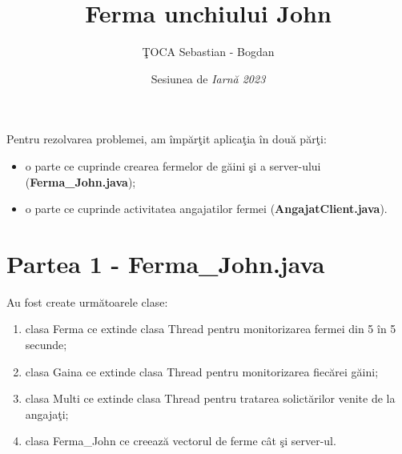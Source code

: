 \documentclass[12pt,a4paper]{article}
\author{\c{T}OCA Sebastian - Bogdan}
\title{\Huge Ferma unchiului John}
\date{Sesiunea de \emph{Iarn\u{a} 2023}}
\begin{document}
\maketitle


    Pentru rezolvarea problemei, am \^imp\u{a}r\c{t}it aplica\c{t}ia \^in dou\u{a} p\u{a}r\c{t}i:
\begin{itemize}
    	\item o parte ce cuprinde crearea fermelor de g\u{a}ini \c{s}i a server-ului (\textbf{Ferma\_John.java});
    	\item o parte ce cuprinde activitatea angaja{t}ilor fermei (\textbf{AngajatClient.java}).
	\end{itemize}
	
\section{Partea 1 - \textbf{Ferma\_John.java}}
    Au fost create urm\u{a}toarele clase:
    \begin{enumerate}
      \item clasa Ferma ce extinde clasa Thread pentru monitorizarea fermei din 5 \^{i}n 5 secunde;
      \item clasa  Gaina ce extinde clasa Thread pentru monitorizarea fiec\u{a}rei g\u{a}ini;
      \item clasa Multi ce extinde clasa Thread pentru tratarea solict\u{a}rilor venite de la angaja\c{t}i;
      \item clasa Ferma\_John ce creeaz\u{a} vectorul de ferme c\^{a}t \c{s}i server-ul.
    \end{enumerate}
    
\end{document}
